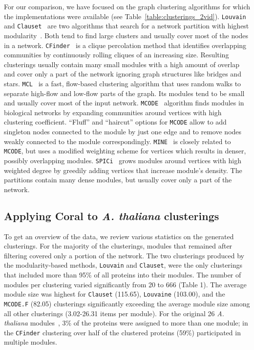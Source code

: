 \documentclass[12pt]{cmuthesis}
\newcommand\Coral{Coral\xspace}
\newcommand{\Athal}{\textit{A. thaliana}\xspace}
\begin{document}
  For our comparison, we have focused on the graph clustering algorithms
  for which the implementations were available (see
  Table~\ref{table:clusterings_2vid}). \texttt{Louvain}~\cite{Blondel2008} and
  \texttt{Clauset}~\cite{Clauset2004} are two algorithms that search for a
  network partition with highest modularity~\cite{newman06}. Both tend to find
  large clusters and usually cover most of the nodes in a network.
  \texttt{CFinder}~\cite{Adamcsek2006} is a clique percolation method that
  identifies overlapping communities by continuously rolling cliques of an
  increasing size. Resulting clusterings usually contain many small modules with
  a high amount of overlap and cover only a part of the network ignoring
  graph structures like bridges and stars. \texttt{MCL}~\cite{VanDongen2000} is a
  fast, flow-based clustering algorithm that uses random walks to separate
  high-flow and low-flow parts of the graph. Its modules tend to be small and
  usually cover most of the input network. \texttt{MCODE}~\cite{Bader2003}
  algorithm finds modules in biological networks by expanding communities around
  vertices with high clustering coefficient. ``Fluff'' and ``haircut'' options for
  \texttt{MCODE} allow to add singleton nodes connected to the module
  by just one edge and to remove nodes weakly connected to the module
  correspondingly. \texttt{MINE}~\cite{Rhrissorrakrai2011} is closely related to
  \texttt{MCODE}, but uses a modified weighting scheme for vertices which results
  in denser, possibly overlapping modules.
  \texttt{SPICi}~\cite{Jiang2010} grows modules around vertices with high
  weighted degree by greedily adding vertices that increase module's density. The
  partitions contain many dense modules, but usually cover only a part of the
  network.

  \subsection{Applying \Coral to \Athal clusterings}


  To get an overview of the data, we review various statistics on
  the generated clusterings. For the majority of the clusterings, modules
  that remained after filtering covered only a portion of the network. The two
  clusterings produced by the modularity-based methods, \texttt{Louvain} and
  \texttt{Clauset}, were the only clusterings that included more than 95\% of all
  proteins into their modules. The number of modules per clustering varied
  significantly from 20 to 666 (Table 1).
  The average module size was highest for \texttt{Clauset} (115.65),
  \texttt{Louvaine} (103.00), and the \texttt{MCODE.F} (82.05) clusterings
  significantly exceeding the average module size among all other clusterings
  (3.02-26.31 items per module). For the original 26 \Athal
  modules~\cite{Vidal2011}, 3\% of the proteins were assigned to more than one
  module; in the \texttt{CFinder} clustering over half of the clustered proteins
  (59\%) participated in multiple modules.
\end{document}
